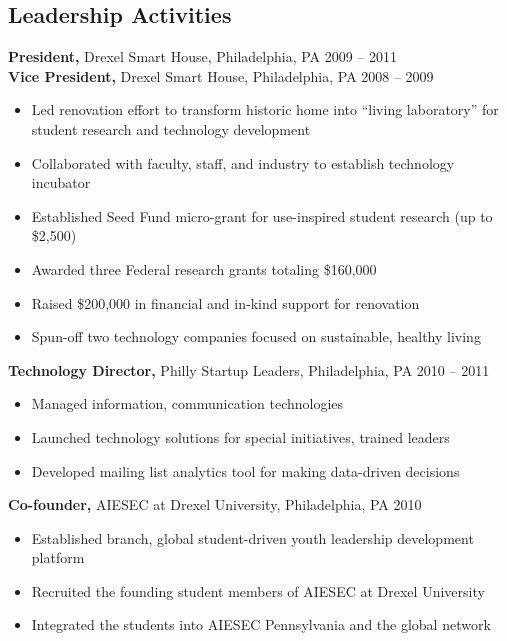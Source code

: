 \documentclass[margin]{res}
\begin{document}
\begin{resume}
\section{Leadership  Activities} 
     {\bf President,} Drexel Smart House, Philadelphia, PA \hfill 2009 -- 2011 \\
     {\bf Vice President,} Drexel Smart House, Philadelphia, PA \hfill 2008 -- 2009
     \begin{itemize} \itemsep -2pt
     \item Led renovation effort to transform historic home into ``living laboratory'' for student research and technology development 
     \item Collaborated with faculty, staff, and industry to establish technology incubator
     \item Established Seed Fund micro-grant for use-inspired student research (up to \$2,500)   
     \item Awarded three Federal research grants totaling \$160,000
     \item Raised \$200,000 in financial and in-kind support for renovation
	\item Spun-off two technology companies focused on sustainable, healthy living
	\end{itemize}

	{\bf  Technology Director,}  Philly Startup Leaders, Philadelphia, PA \hfill 2010 -- 2011 
	\begin{itemize} \itemsep -2pt
	\item Managed information, communication technologies 
	\item Launched technology solutions for special initiatives, trained leaders 
	\item Developed mailing list analytics tool for making data-driven decisions 
	\end{itemize}

     {\bf Co-founder,} AIESEC at Drexel University, Philadelphia, PA \hfill 2010 
     \begin{itemize} \itemsep -2pt
     \item Established branch, global student-driven youth leadership development platform
     \item Recruited the founding student members of AIESEC at Drexel University
	\item Integrated the students into AIESEC Pennsylvania and the global network
	\end{itemize}


\end{resume}
\end{document}
